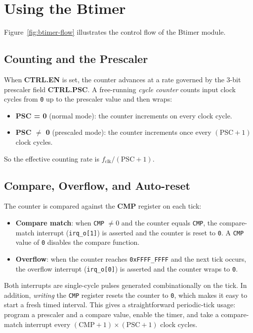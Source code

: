 \section*{Using the Btimer}

Figure~\autoref{fig:btimer-flow} illustrates the control flow of the Btimer module. 

\subsection{Counting and the Prescaler}

When \textbf{CTRL.EN} is set, the counter advances at a rate governed by the 3-bit prescaler field
\textbf{CTRL.PSC}. A free-running \emph{cycle counter} counts input clock cycles from \texttt{0} up
to the prescaler value and then wraps:
\begin{itemize}[nosep]
  \item \textbf{PSC = 0} (normal mode): the counter increments on every clock cycle.
  \item \textbf{PSC $\neq$ 0} (prescaled mode): the counter increments once every
        $(\mathrm{PSC}+1)$ clock cycles.
\end{itemize}
So the effective counting rate is $f_{\mathrm{clk}} / (\mathrm{PSC}+1)$.

\subsection{Compare, Overflow, and Auto-reset}

The counter is compared against the \textbf{CMP} register on each tick:
\begin{itemize}[nosep]
  \item \textbf{Compare match}: when \texttt{CMP} $\neq 0$ and the counter equals \texttt{CMP}, the
        compare-match interrupt (\texttt{irq\_o[1]}) is asserted and the counter is reset to
        \texttt{0}. A \texttt{CMP} value of \texttt{0} disables the compare function.
  \item \textbf{Overflow}: when the counter reaches \texttt{0xFFFF\_FFFF} and the next tick occurs,
        the overflow interrupt (\texttt{irq\_o[0]}) is asserted and the counter wraps to \texttt{0}.
\end{itemize}
Both interrupts are single-cycle pulses generated combinationally on the tick. In addition,
\emph{writing} the \texttt{CMP} register resets the counter to \texttt{0}, which makes it easy to
start a fresh timed interval. This gives a straightforward periodic-tick usage: program a prescaler
and a compare value, enable the timer, and take a compare-match interrupt every
$(\mathrm{CMP}+1)\times(\mathrm{PSC}+1)$ clock cycles.

